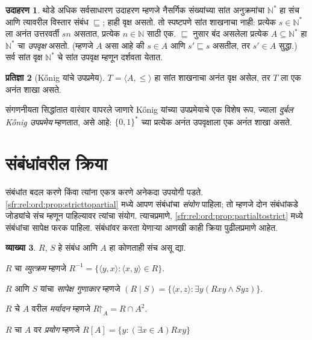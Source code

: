 \documentclass[11pt,a4paper,openany]{book}
\theoremstyle{definition}
\newtheorem{defn}{व्याख्या}[section]
\newtheorem{ex}[defn]{उदाहरण}
\newtheorem{prop}[defn]{प्रतिज्ञा}
\newcommand{\Setabs}[2]{\{#1:#2\}}
\newcommand{\tuple}[1]{\langle #1\rangle}
\newcommand{\Nat}{\mathbb{N}}
\newcommand{\funrestrictionto}[2]{#1\mathord{\restriction}_{#2}}
\newcommand{\funimage}[2]{#1[#2]}
\begin{document}
\begin{ex}
थोडे अधिक सर्वसाधारण उदाहरण म्हणजे नैसर्गिक संख्यांच्या सांत अनुक्रमांचा
$\Nat^*$ हा संच आणि त्यावरील विस्तार संबंध $\sqsubseteq$; हाही वृक्ष
असतो. तो स्पष्टपणे सांत शाखनाचा नाही: प्रत्येक $s \in \Nat^*$ ला अनंत
उत्तरवर्ती $sn$ असतात, प्रत्येक $n \in \Nat$ साठी एक. $\sqsubseteq$
नुसार बंद असलेला प्रत्येक $A \subseteq \Nat^*$ हा $\Nat^*$ चा
\emph{उपवृक्ष} असतो. (म्हणजे $A$ असा आहे की $s \in A$ आणि
$s' \sqsubseteq s$ असतील, तर $s' \in A$ सुद्धा.) सर्व सांत वृक्ष
$\Nat^*$ चे सांत उपवृक्ष म्हणून दर्शवता येतात.
\end{ex}

\begin{prop}[K\H{o}nig यांचे उपप्रमेय]
$T = \tuple{A,\le}$ हा सांत शाखनाचा अनंत वृक्ष असेल, तर $T$ ला
एक अनंत शाखा असते.
\end{prop}

संगणनीयता सिद्धांतात वारंवार वापरले जाणारे K\H{o}nig यांच्या उपप्रमेयाचे
एक विशेष रूप, ज्याला \emph{दुर्बल K\H{o}nig उपप्रमेय} म्हणतात, असे आहे:
$\{0,1\}^*$ च्या प्रत्येक अनंत उपवृक्षाला एक अनंत शाखा असते.











\section{संबंधांवरील क्रिया}\label{sfr:rel:ops:sec}

संबंधांत बदल करणे किंवा त्यांना एकत्र करणे अनेकदा उपयोगी पडते.
\ref{sfr:rel:ord:prop:stricttopartial} मध्ये आपण संबंधांचा
\emph{संयोग} पाहिला; तो म्हणजे दोन संबंधांकडे जोड्यांचे संच म्हणून
पाहिल्यावर त्यांचा संयोग. त्याचप्रमाणे,
\ref{sfr:rel:ord:prop:partialtostrict} मध्ये संबंधांचा सापेक्ष फरक
पाहिला. संबंधांवर करता येणाऱ्या आणखी काही क्रिया पुढीलप्रमाणे आहेत.

\begin{defn}\label{sfr:rel:ops:relationoperations}
$R$, $S$ हे संबंध आणि $A$ हा कोणताही संच असू द्या.

$R$ चा \emph{व्युत्क्रम} म्हणजे $R^{-1} = \Setabs{\tuple{y, x}}{\tuple{x,
    y} \in R}$.

$R$ आणि $S$ यांचा \emph{सापेक्ष गुणाकार} म्हणजे $(R \mid S) =
\{\tuple{x, z} : \exists y(Rxy \land Syz)\}$.

$R$ चे $A$ वरील \emph{मर्यादन} म्हणजे $\funrestrictionto{R}{A}= R
\cap A^2$.

$R$ चा $A$ वर \emph{प्रयोग} म्हणजे $\funimage{R}{A} = \{y :
(\exists x \in A)Rxy\}$
\end{defn}
\end{document}
